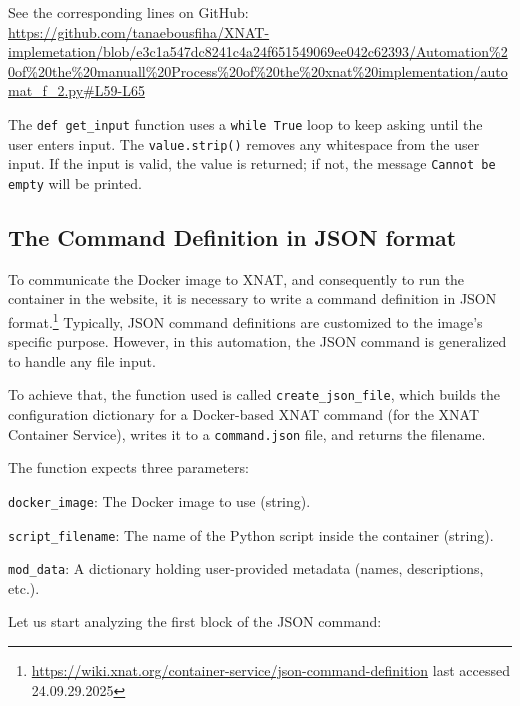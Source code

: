 

\noindent\footnotesize See the corresponding lines on GitHub:\url{ https://github.com/tanaebousfiha/XNAT-implemetation/blob/e3c1a547dc8241c4a24f651549069ee042c62393/Automation%20of%20the%20manuall%20Process%20of%20the%20xnat%20implementation/automat_f_2.py#L59-L65}
\normalsize

The \texttt{def get\_input} function uses a \texttt{while True} loop to keep asking until the user enters input. The \texttt{value.strip()} removes any whitespace from the user input. If the input is valid, the value is returned; if not, the message \texttt{Cannot be empty} will be printed.

\subsection{The Command Definition in JSON format}

To communicate the Docker image to XNAT, and consequently to run the container in the website, it is necessary to write a command definition in JSON format.\footnote{\url{ https://wiki.xnat.org/container-service/json-command-definition} last accessed 24.09.29.2025}
Typically, JSON command definitions are customized to the image's specific purpose. However, in this automation, the JSON command is generalized to handle any file input.

To achieve that, the function used is called \texttt{create\_json\_file}, which builds the configuration dictionary for a Docker-based XNAT command (for the XNAT Container Service), writes it to a \texttt{command.json} file, and returns the filename.

The function expects three parameters:

\texttt{docker\_image}: The Docker image to use (string).

\texttt{script\_filename}: The name of the Python script inside the container (string).

\texttt{mod\_data}: A dictionary holding user-provided metadata (names, descriptions, etc.).

Let us start analyzing the first block of the JSON command:





